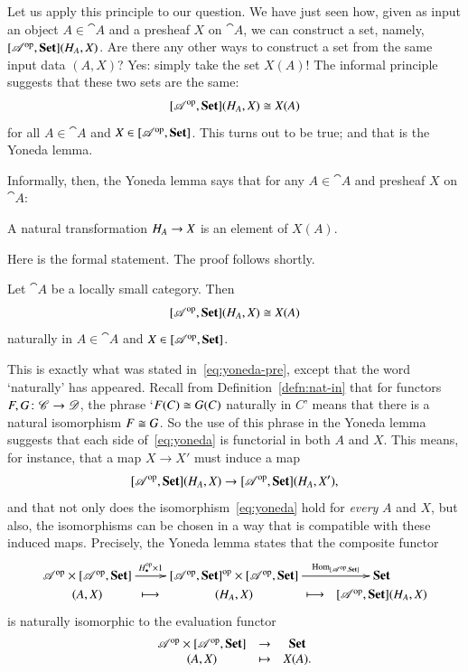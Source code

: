 Let us apply this principle to our question.  We have just seen how, given
as input an object $A \in \cat{A}$ and a presheaf $X$ on $\cat{A}$, we can
construct a set, namely, $[\mathscr{A}^{\mathrm{op}},\mathbf{Set}](H_A, X)$.  Are there any other
ways to construct a set from the same input data $(A, X)$?  Yes: simply
take the set $X(A)$!  The informal principle suggests that these two sets
are the same:
%
\begin{equation}
\label{eq:yoneda-pre}
[\mathscr{A}^{\mathrm{op}},\mathbf{Set}](H_A, X) \cong X(A)
\end{equation}
%
for all $A \in \cat{A}$ and $X \in [\mathscr{A}^{\mathrm{op}},\mathbf{Set}]$.  This turns out to be
true; and that is the Yoneda lemma.%
%
%

Informally, then, the Yoneda lemma says that for any $A \in \cat{A}$ and
presheaf $X$ on $\cat{A}$:
%
\begin{slogan}
A natural transformation $H_A \to X$ is an element of $X(A)$.
\end{slogan}
%
Here is the formal statement.  The proof follows shortly.

\begin{thm}[Yoneda]
\label{thm:yoneda}
%
%
Let $\cat{A}$ be a locally small category.  Then
%
\begin{equation}
\label{eq:yoneda}
[\mathscr{A}^{\mathrm{op}},\mathbf{Set}](H_A, X)
\cong
X(A)
\end{equation}
%
naturally in $A \in \cat{A}$ and $X \in [\mathscr{A}^{\mathrm{op}},\mathbf{Set}]$.
\end{thm}

This is exactly what was stated in~\eqref{eq:yoneda-pre}, except that the
word `naturally' has appeared.  Recall from Definition~\ref{defn:nat-in}
that for functors $F, G\from \cat{C} \to \cat{D}$, the phrase `$F(C) \cong
G(C)$ naturally in $C$' means that there is a natural isomorphism $F \cong
G$.  So the use of this phrase in the Yoneda lemma suggests that each side
of~\eqref{eq:yoneda} is functorial in both $A$ and $X$.  This means, for
instance, that a map $X \to X'$ must induce a map
\[
[\mathscr{A}^{\mathrm{op}},\mathbf{Set}](H_A, X)
\to
[\mathscr{A}^{\mathrm{op}},\mathbf{Set}](H_A, X'),
\]
and that not only does the isomorphism~\eqref{eq:yoneda} hold for
\emph{every} $A$ and $X$, but also, the isomorphisms can be chosen in a way
that is compatible with these induced maps.  Precisely, the Yoneda lemma
states that the composite functor
\[
\xymatrix@R=0em{
\cat{A}^\op \times \pshf{\cat{A}}  \ar[r]^-{\h_\bl^\op \times 1} &
{\pshf{\cat{A}}}^\op \times \pshf{\cat{A}}
\ar[r]^-{\Hom_{\pshf{\cat{A}}}} &
\Set    \\
(A, X) \ar@{}[r]|(.43)*+{\longmapsto} &
(\h_A, X) \ar@{}[r]|(.55)*+{\longmapsto} &
\pshf{\cat{A}}(\h_A, X)
}
\]
is naturally isomorphic to the evaluation%
%
%
 functor
\[
\begin{array}{ccc}
\mathscr{A}^{\mathrm{op}} \times [\mathscr{A}^{\mathrm{op}},\mathbf{Set}]       &\to            &\mathbf{Set}   \\
(A, X)                                  &\mapsto        &X(A).
\end{array}
\]

